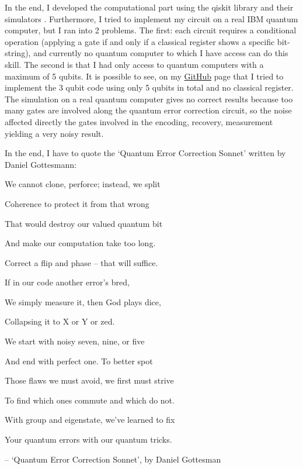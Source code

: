 In the end, I developed the computational part using the qiskit library and their simulators \cite{Qiskit}. Furthermore, I tried to implement my circuit on a real IBM quantum computer, but I ran into 2 problems. The first: each circuit requires a conditional operation (applying a gate if and only if a classical register shows a specific bit-string), and currently no quantum computer to which I have access can do this skill. The second is that I had only access to quantum computers with a maximum of 5 qubits. 
It is possible to see, on my \href{https://github.com/AlexsashaV4/bachelor_thesis_QEC.git}{GitHub} page that I tried to implement the 3 qubit code using only 5 qubits in total and no classical register. The simulation on a real quantum computer gives no correct results because too many gates are involved along the quantum error correction circuit, so the noise affected directly the gates involved in the encoding, recovery, measurement yielding a very noisy result.  






In the end, I have to quote the ‘Quantum Error Correction Sonnet’ written by Daniel Gottesmann: 

\centering
We cannot clone, perforce; instead, we split 

Coherence to protect it from that wrong 

That would destroy our valued quantum bit 

And make our computation take too long.

\bigskip

Correct a flip and phase – that will suffice.

If in our code another error’s bred,


We simply measure it, then God plays dice, 

Collapsing it to X or Y or zed.

\bigskip

We start with noisy seven, nine, or five


And end with perfect one. To better spot


Those flaws we must avoid, we first must strive 

To find which ones commute and which do not.
\bigskip

With group and eigenstate, we’ve learned to fix


Your quantum errors with our quantum tricks.


– ‘Quantum Error Correction Sonnet’, by Daniel Gottesman
